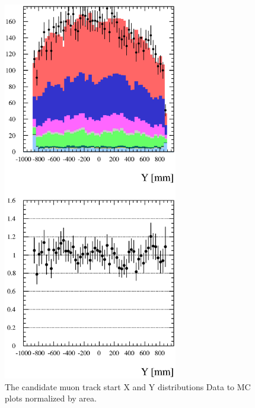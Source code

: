 \begin{figure}[h]
  \includegraphics[width=3in]{Figures/P0DTrkYRun1Run2-normByRatio.eps}
  \caption{The candidate muon track start X and Y distributions 
Data to MC plots normalized by area.} 
  \label{fig:ResultsNormXY}%
\end{figure}

